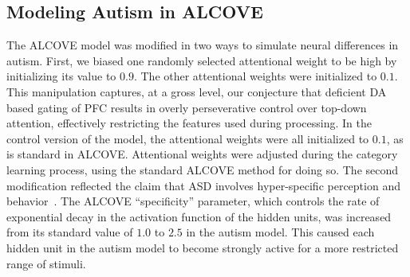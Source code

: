 \subsection{Modeling Autism in ALCOVE}
The ALCOVE model was modified in two ways to simulate neural differences in autism. First, we biased one randomly selected attentional weight to be high by initializing its value to $0.9$. The other attentional weights were initialized to $0.1$. This manipulation captures, at a gross level, our conjecture that deficient DA based gating of PFC results in overly perseverative control over top-down attention, effectively restricting the features used during processing. In the control version of the model, the attentional weights were all initialized to $0.1$, as is standard in ALCOVE. Attentional weights were adjusted during the category learning process, using the standard ALCOVE method for doing so. The second modification reflected the claim that ASD involves hyper-specific perception and behavior~\cite{HappeF:1999:WCC}. The ALCOVE ``specificity'' parameter, which controls the rate of exponential decay in the activation function of the hidden units, was increased from its standard value of $1.0$ to $2.5$ in the autism model. This caused each hidden unit in the autism model to become strongly active for a more restricted range of stimuli.



